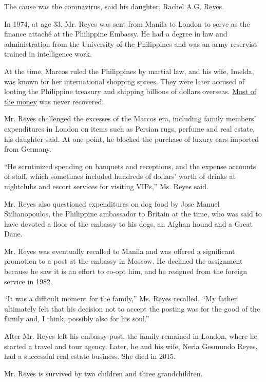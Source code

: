 The cause was the coronavirus, said his daughter, Rachel A.G. Reyes.

In 1974, at age 33, Mr. Reyes was sent from Manila to London to serve as
the finance attaché at the Philippine Embassy. He had a degree in law
and administration from the University of the Philippines and was an
army reservist trained in intelligence work.

At the time, Marcos ruled the Philippines by martial law, and his wife,
Imelda, was known for her international shopping sprees. They were later
accused of looting the Philippine treasury and shipping billions of
dollars overseas.
\href{https://www.nytimes.com/2018/11/09/world/asia/imelda-marcos-sentenced-philippines.html}{Most
of the money} was never recovered.

Mr. Reyes challenged the excesses of the Marcos era, including family
members' expenditures in London on items such as Persian rugs, perfume
and real estate, his daughter said. At one point, he blocked the
purchase of luxury cars imported from Germany.

``He scrutinized spending on banquets and receptions, and the expense
accounts of staff, which sometimes included hundreds of dollars' worth
of drinks at nightclubs and escort services for visiting VIPs,'' Ms.
Reyes said.

Mr. Reyes also questioned expenditures on dog food by Jose Manuel
Stilianopoulos, the Philippine ambassador to Britain at the time, who
was said to have devoted a floor of the embassy to his dogs, an Afghan
hound and a Great Dane.

Mr. Reyes was eventually recalled to Manila and was offered a
significant promotion to a post at the embassy in Moscow. He declined
the assignment because he saw it is an effort to co-opt him, and he
resigned from the foreign service in 1982.

``It was a difficult moment for the family,'' Ms. Reyes recalled. ``My
father ultimately felt that his decision not to accept the posting was
for the good of the family and, I think, possibly also for his soul.''

After Mr. Reyes left his embassy post, the family remained in London,
where he started a travel and tour agency. Later, he and his wife, Neria
Gesmundo Reyes, had a successful real estate business. She died in 2015.

Mr. Reyes is survived by two children and three grandchildren.

\href{https://www.nytimes.com/interactive/2020/obituaries/people-died-coronavirus-obituaries.html?action=click\&pgtype=Article\&state=default\&region=BELOW_MAIN_CONTENT\&context=covid_obits_promo}{}

